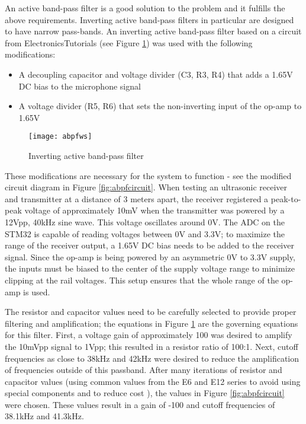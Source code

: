 \documentclass[12pt,a4paper]{report}
\begin{document}
An active band-pass filter is a good solution to the problem and it fulfills the above requirements. Inverting active band-pass filters in particular are designed to have narrow pass-bands. An inverting active band-pass filter based on a circuit from ElectronicsTutorials \cite{abpfws} (see Figure \ref{fig:abpfws}) was used with the following modifications:
\begin{itemize}[noitemsep,topsep=0pt,]
	\item A decoupling capacitor and voltage divider (C3, R3, R4) that adds a 1.65V DC bias to the microphone signal
	\item A voltage divider (R5, R6) that sets the non-inverting input of the op-amp to 1.65V
\end{itemize}

\begin{figure}[htbp]
	\centering
	\texttt{[image: abpfws]}
	\caption{Inverting active band-pass filter \cite{abpfws}}
	\label{fig:abpfws}
\end{figure}

These modifications are necessary for the system to function - see the modified circuit diagram in Figure \ref{fig:abpfcircuit}. When testing an ultrasonic receiver and transmitter at a distance of 3 meters apart, the receiver registered a peak-to-peak voltage of approximately 10mV when the transmitter was powered by a 12Vpp, 40kHz sine wave. This voltage oscillates around 0V. The ADC on the STM32 is capable of reading voltages between 0V and 3.3V; to maximize the range of the receiver output, a 1.65V DC bias needs to be added to the receiver signal. Since the op-amp is being powered by an asymmetric 0V to 3.3V supply, the inputs must be biased to the center of the supply voltage range to minimize clipping at the rail voltages. This setup ensures that the whole range of the op-amp is used.

The resistor and capacitor values need to be carefully selected to provide proper filtering and amplification; the equations in Figure \ref{fig:abpfws} are the governing equations for this filter. First, a voltage gain of approximately 100 was desired to amplify the 10mVpp signal to 1Vpp; this resulted in a resistor ratio of 100:1. Next, cutoff frequencies as close to 38kHz and 42kHz were desired to reduce the amplification of frequencies outside of this passband. After many iterations of resistor and capacitor values (using common values from the E6 and E12 series to avoid using special components and to reduce cost \cite{e6e12}), the values in Figure \ref{fig:abpfcircuit} were chosen. These values result in a gain of -100 and cutoff frequencies of 38.1kHz and 41.3kHz. 
\end{document}

